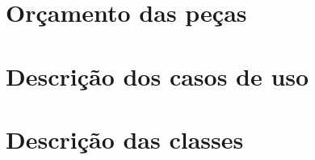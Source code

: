 \apendices
\chapter{Orçamento das peças}


\chapter{Descrição dos casos de uso}
\label{apendice_caso_uso}


\chapter{Descrição das classes}
\label{apendice_classes}
